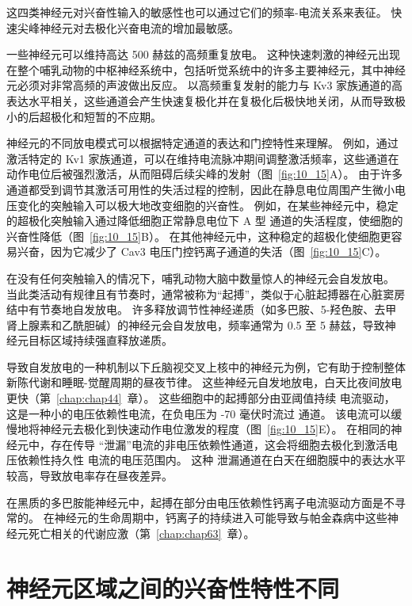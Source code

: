 这四类神经元对兴奋性输入的敏感性也可以通过它们的频率-电流关系来表征。
快速尖峰神经元对去极化兴奋电流的增加最敏感。


一些神经元可以维持高达 500 赫兹的高频重复放电。
这种快速刺激的神经元出现在整个哺乳动物的中枢神经系统中，包括听觉系统中的许多主要神经元，其中神经元必须对非常高频的声波做出反应。
以高频重复发射的能力与 Kv3 家族通道的高表达水平相关，这些通道会产生快速复极化并在复极化后极快地关闭，从而导致极小的后超极化和短暂的不应期。


神经元的不同放电模式可以根据特定通道的表达和门控特性来理解。
例如，通过激活特定的 Kv1 家族通道，可以在维持电流脉冲期间调整激活频率，这些通道在动作电位后被强烈激活，从而阻碍后续尖峰的发射（图~\ref{fig:10_15}A）。
由于许多通道都受到调节其激活可用性的失活过程的控制，因此在静息电位周围产生微小电压变化的突触输入可以极大地改变细胞的兴奋性。
例如，在某些神经元中，稳定的超极化突触输入通过降低细胞正常静息电位下 A 型  通道的失活程度，使细胞的兴奋性降低（图~\ref{fig:10_15}B）。
在其他神经元中，这种稳定的超极化使细胞更容易兴奋，因为它减少了 Cav3 电压门控钙离子通道的失活（图~\ref{fig:10_15}C）。


在没有任何突触输入的情况下，哺乳动物大脑中数量惊人的神经元会自发放电。
当此类活动有规律且有节奏时，通常被称为“起搏”，类似于心脏起搏器在心脏窦房结中有节奏地自发放电。
许多释放调节性神经递质（如多巴胺、5-羟色胺、去甲肾上腺素和乙酰胆碱）的神经元会自发放电，频率通常为 0.5 至 5 赫兹，导致神经元目标区域持续强直释放递质。


导致自发放电的一种机制以下丘脑视交叉上核中的神经元为例，它有助于控制整体新陈代谢和睡眠-觉醒周期的昼夜节律。
这些神经元自发地放电，白天比夜间放电更快（第~\ref{chap:chap44}~章）。 
这些细胞中的起搏部分由亚阈值持续  电流驱动，这是一种小的电压依赖性电流，在负电压为 -70 毫伏时流过  通道。
该电流可以缓慢地将神经元去极化到快速动作电位激发的程度（图~\ref{fig:10_15}E）。
在相同的神经元中，存在传导 “泄漏”电流的非电压依赖性通道，这会将细胞去极化到激活电压依赖性持久性  电流的电压范围内。
这种  泄漏通道在白天在细胞膜中的表达水平较高，导致放电率存在昼夜差异。


在黑质的多巴胺能神经元中，起搏在部分由电压依赖性钙离子电流驱动方面是不寻常的。
在神经元的生命周期中，钙离子的持续进入可能导致与帕金森病中这些神经元死亡相关的代谢应激（第~\ref{chap:chap63}~章）。



\section{神经元区域之间的兴奋性特性不同}

